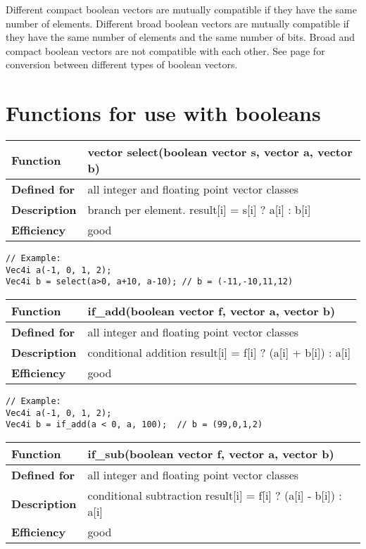 \documentclass[vcl_manual.tex]{subfiles}
\begin{document}
Different compact boolean vectors are mutually compatible if they have the same number of elements. Different broad boolean vectors are mutually compatible if they have the same number of elements and the same number of bits. Broad and compact boolean vectors are not compatible with each other. See page \pageref{ConversionBetweenBooleanTypes} for conversion between different types of boolean vectors.


\section{Functions for use with booleans}\label{FunctionsForBooleans}

\begin{tabular}{|p{30mm}|p{120mm}|}
\hline
\bfseries Function & vector select(boolean vector s, vector a, vector b) \\ \hline
\bfseries Defined for & all integer and floating point vector classes \\ \hline
\bfseries Description & branch per element.\newline
result[i] = s[i] ? a[i] : b[i] \\ \hline
\bfseries Efficiency & good \\ \hline
\end{tabular}
\begin{lstlisting}[frame=none]
// Example:
Vec4i a(-1, 0, 1, 2);
Vec4i b = select(a>0, a+10, a-10); // b = (-11,-10,11,12)
\end{lstlisting}


\begin{tabular}{|p{30mm}|p{120mm}|}
\hline
\bfseries Function & if\_add(boolean vector f, vector a, vector b) \\ \hline
\bfseries Defined for & all integer and floating point vector classes \\ \hline
\bfseries Description & conditional addition \newline
result[i] = f[i] ? (a[i] + b[i]) : a[i] \\ \hline
\bfseries Efficiency & good \\ \hline
\end{tabular}
\begin{lstlisting}[frame=none]
// Example:
Vec4i a(-1, 0, 1, 2);
Vec4i b = if_add(a < 0, a, 100);  // b = (99,0,1,2)
\end{lstlisting}

\begin{tabular}{|p{30mm}|p{120mm}|}
\hline
\bfseries Function & if\_sub(boolean vector f, vector a, vector b) \\ \hline
\bfseries Defined for & all integer and floating point vector classes \\ \hline
\bfseries Description & conditional subtraction \newline
result[i] = f[i] ? (a[i] - b[i]) : a[i] \\ \hline
\bfseries Efficiency & good \\ \hline
\end{tabular}
\end{document}
